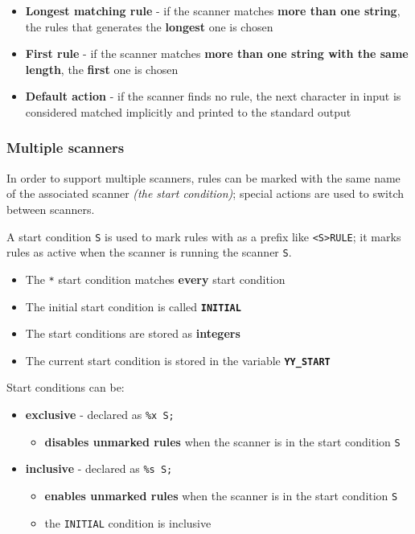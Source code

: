 \documentclass[english]{article}
\begin{document}
\begin{itemize}
  \item \textbf{Longest matching rule} - if the scanner matches \textbf{more than one string}, the rules that generates the \textbf{longest} one is chosen
  \item \textbf{First rule} - if the scanner matches\textbf{ more than one string with the same length}, the \textbf{first} one is chosen
  \item \textbf{Default action} - if the scanner finds no rule, the next character in input is considered matched implicitly and printed to the standard output
\end{itemize}

\subsubsection{Multiple scanners}

In order to support multiple scanners, rules can be marked with the same name of the associated scanner \textit{(the start condition)};
special actions are used to switch between scanners.

A start condition \texttt{S} is used to mark rules with as a prefix like \texttt{<S>RULE};
it marks rules as active when the scanner is running the scanner \texttt{S}.

\begin{itemize}
  \item The \texttt{*} start condition matches \textbf{every} start condition
  \item The initial start condition is called \textbf{\texttt{INITIAL}}
  \item The start conditions are stored as \textbf{integers}
  \item The current start condition is stored in the variable \textbf{\texttt{YY\_START}}
\end{itemize}

\bigskip
Start conditions can be:

\begin{itemize}[label=\textbf{\texttt{>}}]
  \item \textbf{exclusive} - declared as \texttt{\%x S;}
        \begin{itemize}
          \item \textbf{disables unmarked rules} when the scanner is in the start condition \texttt{S}
        \end{itemize}
  \item \textbf{inclusive} - declared as \texttt{\%s S;}
        \begin{itemize}
          \item \textbf{enables unmarked rules} when the scanner is in the start condition \texttt{S}
          \item the \texttt{INITIAL} condition is inclusive
        \end{itemize}
\end{itemize}
\end{document}
